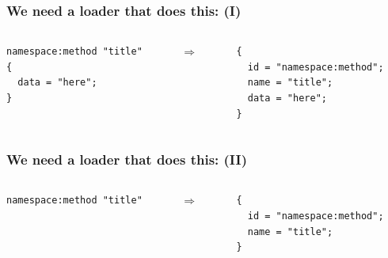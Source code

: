\documentclass[handout]{beamer}
\begin{document}
\begin{frame}[fragile]

\frametitle{We need a loader that does this: (I)}

\begin{columns}

\begin{column}{0.5\textwidth}
\begin{verbatim}
namespace:method "title"
{
  data = "here";
}
\end{verbatim}
\end{column}

\begin{column}{0.05\textwidth}
$\Rightarrow$
\end{column}

\begin{column}{0.5\textwidth}
\begin{verbatim}
{
  id = "namespace:method";
  name = "title";
  data = "here";
}
\end{verbatim}
\end{column}

\end{columns}
\end{frame}


\begin{frame}[fragile]

\frametitle{We need a loader that does this: (II)}

\begin{columns}

\begin{column}{0.5\textwidth}
\begin{verbatim}
namespace:method "title"
\end{verbatim}
\end{column}

\begin{column}{0.05\textwidth}
$\Rightarrow$
\end{column}

\begin{column}{0.5\textwidth}
\begin{verbatim}
{
  id = "namespace:method";
  name = "title";
}
\end{verbatim}
\end{column}

\end{columns}

\end{frame}
\end{document}
